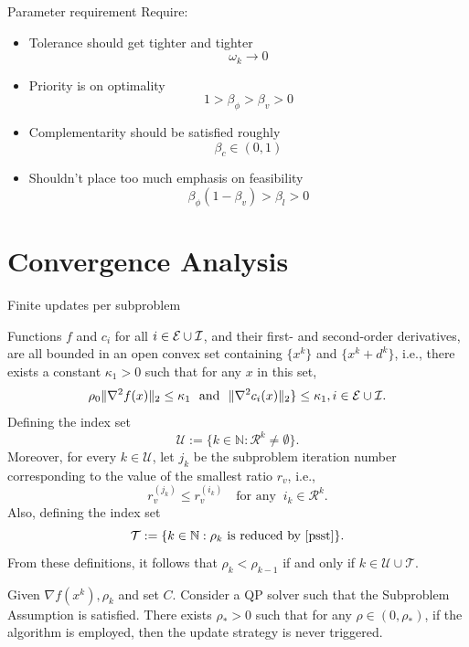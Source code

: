 \documentclass[8pt]{beamer}
\begin{document}
	\begin{frame}{Parameter requirement}
		Require: 
		\vfill
		\begin{itemize}
			\item Tolerance should get tighter and tighter
				\[ \boxed{\omega_k \to 0 }\]
			\item Priority is on optimality 
				\[ \boxed{1> \beta_\phi  > \beta_v > 0}\]
			\item Complementarity should be satisfied roughly 
				\[\boxed{ \beta_c \in (0,1)}\]
			\item Shouldn't place too much emphasis on feasibility 
				\[\boxed{ \beta_\phi(1-\beta_v)   > \beta_l>0 }\]
		\end{itemize}
	\end{frame}

\section[Convergence Analysis]{Convergence Analysis}

	\begin{frame}{Finite updates per subproblem}

		\begin{assumption}\label{ass.algorithm}
		Functions $f$ and $c_i$ for all $i \in {\cal E}\cup{\cal I}$, and their first- and second-order  derivatives, are all  bounded in an open convex set containing $\{x^k\}$ and $\{x^k+d^k\}$, i.e., there exists a constant  $\kappa_1>0$  such that  for any $x$ in this set, 
		\[  \rho_0\|\nabla^2f(x)\|_2 \le \kappa_1\ \text{  and  }\  \|\nabla^2c_i(x)\|_2 \} \le \kappa_1, i\in{\cal E}\cup{\cal I}.\] 
		Defining the index set 
		\[ \mathcal{U} := \{k \in \mathbb{N} : \mathcal{R}^k\ne\emptyset \} . \]
		Moreover, for every $k\in\mathcal{U}$, let $j_k$ be the subproblem iteration number corresponding to the value of the smallest ratio $r_v$, i.e.,
		\[   r_v^{(j_k)} \le r_v^{(i_k)} \quad \text{for any }\  i_k\in\mathcal{R}^k.\]
		Also, defining the index set 
		\[  \mathcal{T} := \{ k \in\mathbb{N}: \rho_k \  \text{is reduced by}\ \eqref{psst} \}. \]
		From these definitions, it follows that $\rho_k < \rho_{k-1}$ if and only if $k\in\mathcal{U}\cup\mathcal{T}$.
		\end{assumption}

		\vfill

		\begin{theorem}
		Given $\nabla f(x^k), \rho_k$ and set $C$.  Consider a QP solver such that the Subproblem Assumption  is satisfied.   There exists $\rho_*>0$ such that for any $\rho\in(0,\rho_*)$,  if the algorithm is employed, then the update strategy is never triggered. 
		\end{theorem}
	\end{frame}
\end{document}
